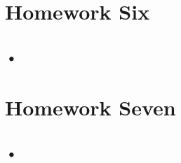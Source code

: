 \documentclass[colorlinks,11pt,a4paper,normalphoto,withhyper,ragged2e]{altareport}
\begin{document}
	
	\pagebreak
	
	
	
	
\section{Homework Six}
	
	\subsection{•}
	
	
	\pagebreak
	
	
	
	
\section{Homework Seven}
	
	\subsection{•}
	
	
	\pagebreak
	
	
	
	
	
	
	
	
\end{document}

